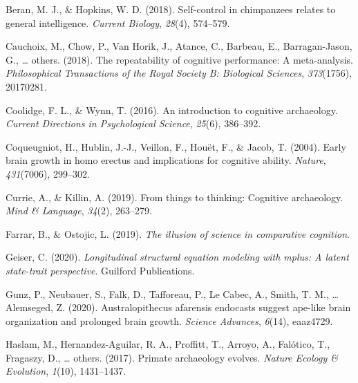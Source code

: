 \documentclass[
  man,floatsintext]{apa6}
\newlength{\cslhangindent}
\newlength{\cslentryspacingunit} %
\newenvironment{CSLReferences}[2] %
 {%
  \setlength{\parindent}{0pt}
  \ifodd #1
  \let\oldpar\par
  \def\par{\hangindent=\cslhangindent\oldpar}
  \fi
  \setlength{\parskip}{#2\cslentryspacingunit}
 }%
 {}
\begin{document}
\hypertarget{refs}{}
\begin{CSLReferences}{1}{0}
\leavevmode{}%
Beran, M. J., \& Hopkins, W. D. (2018). Self-control in chimpanzees relates to general intelligence. \emph{Current Biology}, \emph{28}(4), 574--579.

\leavevmode{}%
Cauchoix, M., Chow, P., Van Horik, J., Atance, C., Barbeau, E., Barragan-Jason, G., \ldots{} others. (2018). The repeatability of cognitive performance: A meta-analysis. \emph{Philosophical Transactions of the Royal Society B: Biological Sciences}, \emph{373}(1756), 20170281.

\leavevmode{}%
Coolidge, F. L., \& Wynn, T. (2016). An introduction to cognitive archaeology. \emph{Current Directions in Psychological Science}, \emph{25}(6), 386--392.

\leavevmode{}%
Coqueugniot, H., Hublin, J.-J., Veillon, F., Houët, F., \& Jacob, T. (2004). Early brain growth in homo erectus and implications for cognitive ability. \emph{Nature}, \emph{431}(7006), 299--302.

\leavevmode{}%
Currie, A., \& Killin, A. (2019). From things to thinking: Cognitive archaeology. \emph{Mind \& Language}, \emph{34}(2), 263--279.

\leavevmode{}%
Farrar, B., \& Ostojic, L. (2019). \emph{The illusion of science in comparative cognition}.

\leavevmode{}%
Geiser, C. (2020). \emph{Longitudinal structural equation modeling with mplus: A latent state-trait perspective}. Guilford Publications.

\leavevmode{}%
Gunz, P., Neubauer, S., Falk, D., Tafforeau, P., Le Cabec, A., Smith, T. M., \ldots{} Alemseged, Z. (2020). Australopithecus afarensis endocasts suggest ape-like brain organization and prolonged brain growth. \emph{Science Advances}, \emph{6}(14), eaaz4729.

\leavevmode{}%
Haslam, M., Hernandez-Aguilar, R. A., Proffitt, T., Arroyo, A., Falótico, T., Fragaszy, D., \ldots{} others. (2017). Primate archaeology evolves. \emph{Nature Ecology \& Evolution}, \emph{1}(10), 1431--1437.


\end{CSLReferences}
\end{document}
